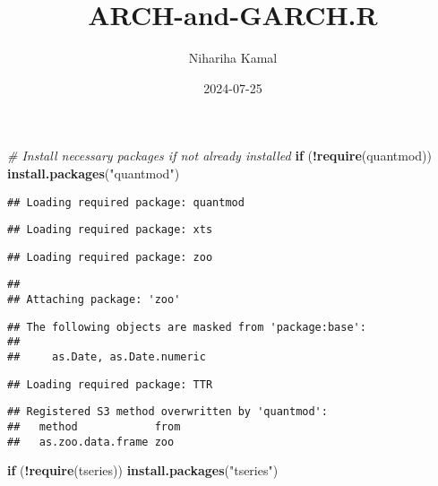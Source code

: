 \documentclass[
]{article}
\title{ARCH-and-GARCH.R}
\author{Nihariha Kamal}
\date{2024-07-25}
\newenvironment{Shaded}{\begin{snugshade}}{\end{snugshade}}
\newcommand{\CommentTok}[1]{\textcolor[rgb]{0.56,0.35,0.01}{\textit{#1}}}
\newcommand{\ControlFlowTok}[1]{\textcolor[rgb]{0.13,0.29,0.53}{\textbf{#1}}}
\newcommand{\FunctionTok}[1]{\textcolor[rgb]{0.13,0.29,0.53}{\textbf{#1}}}
\newcommand{\NormalTok}[1]{#1}
\newcommand{\SpecialCharTok}[1]{\textcolor[rgb]{0.81,0.36,0.00}{\textbf{#1}}}
\newcommand{\StringTok}[1]{\textcolor[rgb]{0.31,0.60,0.02}{#1}}
\begin{document}
\maketitle

\begin{Shaded}
\begin{Highlighting}[]
\CommentTok{\# Install necessary packages if not already installed}
\ControlFlowTok{if}\NormalTok{ (}\SpecialCharTok{!}\FunctionTok{require}\NormalTok{(quantmod)) }\FunctionTok{install.packages}\NormalTok{(}\StringTok{"quantmod"}\NormalTok{)}
\end{Highlighting}
\end{Shaded}

\begin{verbatim}
## Loading required package: quantmod
\end{verbatim}

\begin{verbatim}
## Loading required package: xts
\end{verbatim}

\begin{verbatim}
## Loading required package: zoo
\end{verbatim}

\begin{verbatim}
## 
## Attaching package: 'zoo'
\end{verbatim}

\begin{verbatim}
## The following objects are masked from 'package:base':
## 
##     as.Date, as.Date.numeric
\end{verbatim}

\begin{verbatim}
## Loading required package: TTR
\end{verbatim}

\begin{verbatim}
## Registered S3 method overwritten by 'quantmod':
##   method            from
##   as.zoo.data.frame zoo
\end{verbatim}

\begin{Shaded}
\begin{Highlighting}[]
\ControlFlowTok{if}\NormalTok{ (}\SpecialCharTok{!}\FunctionTok{require}\NormalTok{(tseries)) }\FunctionTok{install.packages}\NormalTok{(}\StringTok{"tseries"}\NormalTok{)}
\end{Highlighting}
\end{Shaded}
\end{document}
